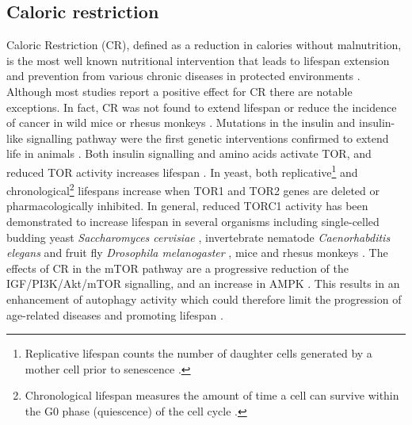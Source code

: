 \subsection{Caloric restriction}
\label{subsec:Caloric restriction}
Caloric Restriction (CR), defined as a reduction in calories without malnutrition, is the most well known nutritional intervention that leads to lifespan extension and prevention from various chronic diseases in protected environments \citep{Gredilla2005, Kapahi2010}. Although most studies report a positive effect for CR there are notable exceptions. In fact, CR was not found to extend lifespan or reduce the incidence of cancer in wild mice \citep{Harper2006} or rhesus monkeys \citep{Mattison2012}. Mutations in the insulin and insulin-like signalling pathway were the first genetic interventions confirmed to extend life in animals \citep{Kenyon2010}. Both insulin signalling and amino acids activate TOR, and reduced TOR activity increases lifespan \citep{Evans2010, Kapahi2004, Kaeberlein2009, Laplante2012}. In yeast, both replicative\footnote{Replicative lifespan counts the number of daughter cells generated by a mother cell prior to senescence \citep{Mortimer1959}.} and chronological\footnote{Chronological 
lifespan measures the amount of time a cell can survive within the G0 phase (quiescence) of the cell cycle \citep{MacLean2001}.} lifespans increase when TOR1 and TOR2 genes are deleted or pharmacologically inhibited. In general, reduced TORC1 activity has been demonstrated to increase lifespan in several organisms including single-celled budding yeast \emph{Saccharomyces cervisiae} \citep{Wanke2008}, invertebrate nematode \emph{Caenorhabditis elegans} and fruit fly \emph{Drosophila melanogaster} \citep{Kapahi2009}, mice \citep{Anisimov2010, Harrison2009} and rhesus monkeys \citep{Colman2009}. The effects of CR in the mTOR pathway are a progressive reduction of the IGF/PI3K/Akt/mTOR signalling, and an increase in AMPK \citep{Jiang2008}. This results in an enhancement of autophagy activity which could therefore limit the progression of age-related diseases and promoting lifespan \citep{Ravikumar2010}.



